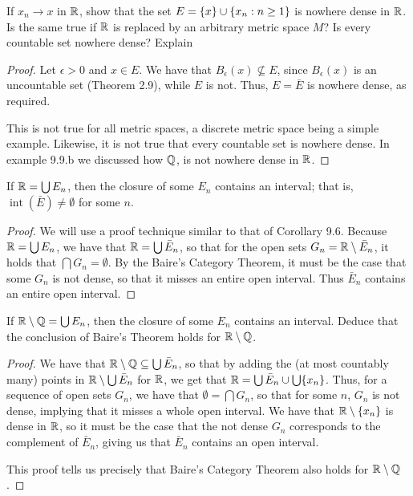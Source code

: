 \begin{exercise}{21}
If $x_n \to x$ in $\mathbb{R}$, show that the set $E = \{x\} \cup \{x_n: n \geq 1\}$ is nowhere dense in $\mathbb{R}$.
Is the same true if $\mathbb{R}$ is replaced by an arbitrary metric space $M$?
Is every countable set nowhere dense?
Explain
\end{exercise}
\begin{proof}
Let $\epsilon >0$ and $x \in E$.
We have that $B_\epsilon(x) \not\subseteq E$, since $B_\epsilon(x)$ is an uncountable set (Theorem 2.9), while $E$ is not.
Thus, $E = \bar{E}$ is nowhere dense, as required.

This is not true for all metric spaces, a discrete metric space being a simple example.
Likewise, it is not true that every countable set is nowhere dense.
In example 9.9.b we discussed how $\mathbb{Q}$, is not nowhere dense in $\mathbb{R}$.
\end{proof} 

\begin{exercise}{24}
If $\mathbb{R} = \bigcup E_n$, then the closure of some $E_n$ contains an interval;
that is, $\operatorname{int}(\bar{E}) \neq \emptyset$ for some $n$.
\end{exercise}
\begin{proof}
We will use a proof technique similar to that of Corollary 9.6.
Because $\mathbb{R} = \bigcup E_n$, we have that $\mathbb{R} = \bigcup \bar{E}_n$, so that for the open sets $G_n = \mathbb{R} \setminus \bar{E}_n$, it holds that $\bigcap G_n = \emptyset$.
By the Baire's Category Theorem, it must be the case that some $G_n$ is not dense, so that it misses an entire open interval. 
Thus $\bar{E}_n$ contains an entire open interval.
\end{proof} 

\begin{exercise}{25}
If $\mathbb{R} \setminus \mathbb{Q} = \bigcup E_n$, then the closure of some $E_n$ contains an interval.
Deduce that the conclusion of Baire's Theorem holds for $\mathbb{R} \setminus \mathbb{Q}$.
\end{exercise}
\begin{proof}
We have that $\mathbb{R} \setminus \mathbb{Q} \subseteq \bigcup \bar{E}_n$, so that by adding the (at most countably many) points in $\mathbb{R} \setminus \bigcup \bar{E}_n$ for $\mathbb{R}$, we get that $\mathbb{R} = \bigcup \bar{E}_n \cup \bigcup \{x_n\}$.
Thus, for a sequence of open sets $G_n$, we have that $\emptyset = \bigcap G_n$, so that for some $n$, $G_n$ is not dense, implying that it misses a whole open interval.
We have that $\mathbb{R} \setminus \{x_n\}$ is dense in $\mathbb{R}$, so it must be the case that the not dense $G_n$ corresponds to the complement of $\bar{E}_n$, giving us that $\bar{E}_n$ contains an open interval.

This proof tells us precisely that Baire's Category Theorem also holds for $\mathbb{R} \setminus \mathbb{Q}$.
\end{proof} 

